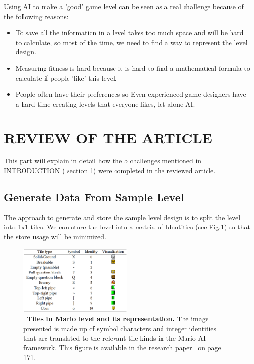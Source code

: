 \documentclass[runningheads]{llncs}
\begin{document}
Using AI to make a 'good' game level can be seen as a real challenge because of the following reasons:
\begin{itemize}
\item To save all the information in a level takes too much space and will be hard to calculate, so most of the time, we need to find a way to represent the level design.
\item Measuring fitness is hard because it is hard to find a mathematical formula to calculate if people 'like' this level.
\item People often have their preferences so Even experienced game designers have a hard time creating levels that everyone likes, let alone AI.
\end{itemize}



\section{REVIEW OF THE ARTICLE}
This part will explain in detail how the 5 challenges mentioned in INTRODUCTION ( section 1) were completed in the reviewed article.

\subsection{Generate Data From Sample Level}
 The approach to generate and store the sample level design is to split the level into 1x1 tiles. We can store the level into a matrix of Identities (see Fig.1) so that the store usage will be minimized.
 
 \begin{figure}
\includegraphics[width=0.5\textwidth]{Figure1.eps}
\centering
\caption{ ~\textbf{Tiles in Mario level and its representation.} The image presented is made up of symbol characters and integer identities that are translated to the relevant tile kinds in the Mario AI framework. This figure is  available in the research paper~\cite{ref_lncs1} on page 171.} \label{Figure1}
\end{figure}
\end{document}
